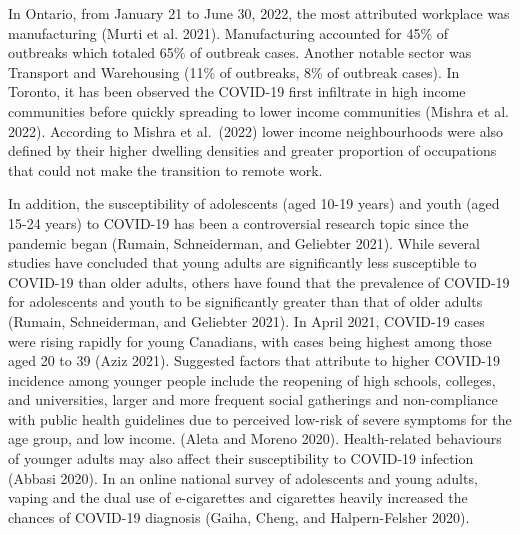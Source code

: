 \documentclass[]{article}
\begin{document}
In Ontario, from January 21 to June 30, 2022, the most attributed
workplace was manufacturing (Murti et al. 2021). Manufacturing accounted
for 45\% of outbreaks which totaled 65\% of outbreak cases. Another
notable sector was Transport and Warehousing (11\% of outbreaks, 8\% of
outbreak cases). In Toronto, it has been observed the COVID-19 first
infiltrate in high income communities before quickly spreading to lower
income communities (Mishra et al. 2022). According to Mishra et
al.~(2022) lower income neighbourhoods were also defined by their higher
dwelling densities and greater proportion of occupations that could not
make the transition to remote work.

In addition, the susceptibility of adolescents (aged 10-19 years) and
youth (aged 15-24 years) to COVID-19 has been a controversial research
topic since the pandemic began (Rumain, Schneiderman, and Geliebter
2021). While several studies have concluded that young adults are
significantly less susceptible to COVID-19 than older adults, others
have found that the prevalence of COVID-19 for adolescents and youth to
be significantly greater than that of older adults (Rumain,
Schneiderman, and Geliebter 2021). In April 2021, COVID-19 cases were
rising rapidly for young Canadians, with cases being highest among those
aged 20 to 39 (Aziz 2021). Suggested factors that attribute to higher
COVID-19 incidence among younger people include the reopening of high
schools, colleges, and universities, larger and more frequent social
gatherings and non-compliance with public health guidelines due to
perceived low-risk of severe symptoms for the age group, and low income.
(Aleta and Moreno 2020). Health-related behaviours of younger adults may
also affect their susceptibility to COVID-19 infection (Abbasi 2020). In
an online national survey of adolescents and young adults, vaping and
the dual use of e-cigarettes and cigarettes heavily increased the
chances of COVID-19 diagnosis (Gaiha, Cheng, and Halpern-Felsher 2020).
\end{document}

